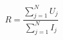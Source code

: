 \documentclass[A4,11pt]{article}
\begin{document}
\thispagestyle{empty}
$$
R = \frac{\sum\limits_{j=1}^N U_j}{\sum\limits_{j=1}^N I_j}
$$
\end{document}
